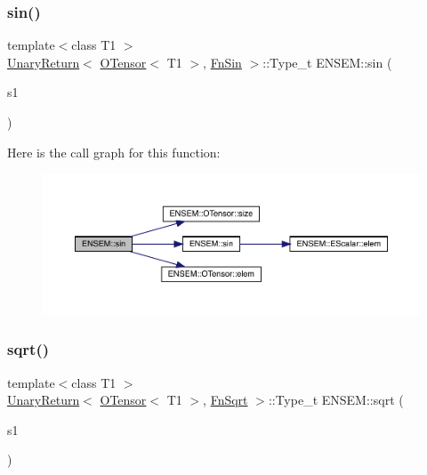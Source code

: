 \subsubsection{\texorpdfstring{sin()}{sin()}}
{\footnotesize\ttfamily template$<$class T1 $>$ \\
\mbox{\hyperlink{structENSEM_1_1UnaryReturn}{Unary\+Return}}$<$ \mbox{\hyperlink{classENSEM_1_1OTensor}{O\+Tensor}}$<$ T1 $>$, \mbox{\hyperlink{structENSEM_1_1FnSin}{Fn\+Sin}} $>$\+::Type\+\_\+t E\+N\+S\+E\+M\+::sin (\begin{DoxyParamCaption}\item[{const \mbox{\hyperlink{classENSEM_1_1OTensor}{O\+Tensor}}$<$ T1 $>$ \&}]{s1 }\end{DoxyParamCaption})\hspace{0.3cm}{\ttfamily [inline]}}

Here is the call graph for this function\+:\nopagebreak
\begin{figure}[H]
\begin{center}
\leavevmode
\includegraphics[width=350pt]{de/d87/group__obstensor_gaa4e4751f0d9a575eaac0fb52f7bb0c73_cgraph}
\end{center}
\end{figure}
\mbox{\label{group__obstensor_gab4101323c19945bf42cbece4b0c2e8b4}} 
\subsubsection{\texorpdfstring{sqrt()}{sqrt()}}
{\footnotesize\ttfamily template$<$class T1 $>$ \\
\mbox{\hyperlink{structENSEM_1_1UnaryReturn}{Unary\+Return}}$<$ \mbox{\hyperlink{classENSEM_1_1OTensor}{O\+Tensor}}$<$ T1 $>$, \mbox{\hyperlink{structENSEM_1_1FnSqrt}{Fn\+Sqrt}} $>$\+::Type\+\_\+t E\+N\+S\+E\+M\+::sqrt (\begin{DoxyParamCaption}\item[{const \mbox{\hyperlink{classENSEM_1_1OTensor}{O\+Tensor}}$<$ T1 $>$ \&}]{s1 }\end{DoxyParamCaption})\hspace{0.3cm}{\ttfamily [inline]}}

